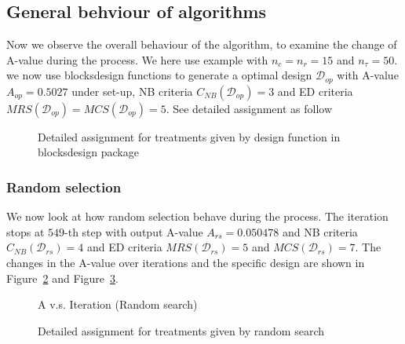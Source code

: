 \documentclass[
  a4paper,
  oneside,
  openany,
  12pt,
  onecolumn]{book}
\theoremstyle{definition}
\theoremstyle{definition}
\theoremstyle{plain}
\theoremstyle{remark}
\begin{document}
\subsection{General behviour of
algorithms}\label{general-behviour-of-algorithms}

Now we observe the overall behaviour of the algorithm, to examine the
change of A-value during the process. We here use example with
\(n_c=n_r=15\) and \(n_\tau=50\). we now use blocksdesign functions to
generate a optimal design \(\mathcal{D}_{op}\) with A-value
\(A_{op} = 0.5027\) under set-up, NB criteria
\(C_{NB}(\mathcal{D}_{op})=3\) and ED criteria
\(MRS(\mathcal{D}_{op})=MCS(\mathcal{D}_{op})=5\). See detailed
assignment as follow

\begin{figure}


\caption{\label{fig-blockdesign}Detailed assignment for treatments given
by design function in blocksdesign package}

\end{figure}%

\subsubsection{Random selection}\label{random-selection}

We now look at how random selection behave during the process. The
iteration stops at \(549\)-th step with output A-value
\(A_{rs}=0.050478\) and NB criteria \(C_{NB}(\mathcal{D}_{rs})=4\) and
ED criteria \(MRS(\mathcal{D}_{rs})=5\) and \(MCS(\mathcal{D}_{rs})=7\).
The changes in the A-value over iterations and the specific design are
shown in Figure~\ref{fig-AvIRS} and Figure~\ref{fig-RS}.

\begin{figure}


\caption{\label{fig-AvIRS}A v.s. Iteration (Random search)}

\end{figure}%

\begin{figure}


\caption{\label{fig-RS}Detailed assignment for treatments given by
random search}

\end{figure}%
\end{document}
